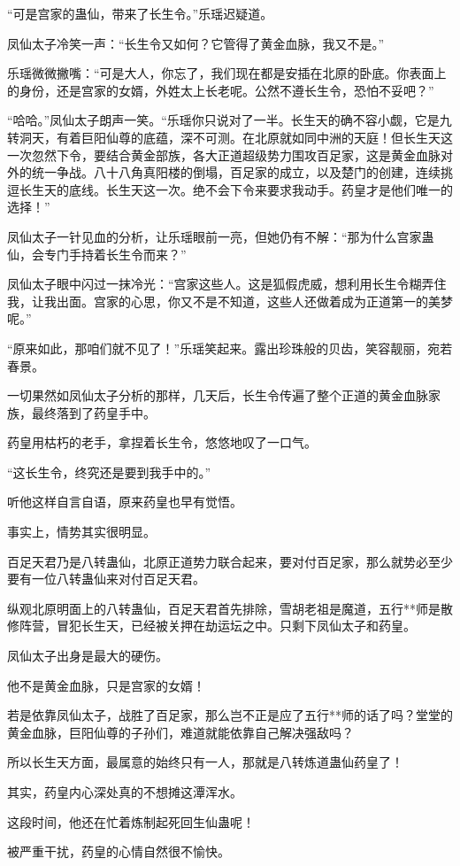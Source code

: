 \begin{this_body}
“可是宫家的蛊仙，带来了长生令。”乐瑶迟疑道。

凤仙太子冷笑一声：“长生令又如何？它管得了黄金血脉，我又不是。”

乐瑶微微撇嘴：“可是大人，你忘了，我们现在都是安插在北原的卧底。你表面上的身份，还是宫家的女婿，外姓太上长老呢。公然不遵长生令，恐怕不妥吧？”

“哈哈。”凤仙太子朗声一笑。“乐瑶你只说对了一半。长生天的确不容小觑，它是九转洞天，有着巨阳仙尊的底蕴，深不可测。在北原就如同中洲的天庭！但长生天这一次忽然下令，要结合黄金部族，各大正道超级势力围攻百足家，这是黄金血脉对外的统一争战。八十八角真阳楼的倒塌，百足家的成立，以及楚门的创建，连续挑逗长生天的底线。长生天这一次。绝不会下令来要求我动手。药皇才是他们唯一的选择！”

凤仙太子一针见血的分析，让乐瑶眼前一亮，但她仍有不解：“那为什么宫家蛊仙，会专门手持着长生令而来？”

凤仙太子眼中闪过一抹冷光：“宫家这些人。这是狐假虎威，想利用长生令糊弄住我，让我出面。宫家的心思，你又不是不知道，这些人还做着成为正道第一的美梦呢。”

“原来如此，那咱们就不见了！”乐瑶笑起来。露出珍珠般的贝齿，笑容靓丽，宛若春景。

一切果然如凤仙太子分析的那样，几天后，长生令传遍了整个正道的黄金血脉家族，最终落到了药皇手中。

药皇用枯朽的老手，拿捏着长生令，悠悠地叹了一口气。

“这长生令，终究还是要到我手中的。”

听他这样自言自语，原来药皇也早有觉悟。

事实上，情势其实很明显。

百足天君乃是八转蛊仙，北原正道势力联合起来，要对付百足家，那么就势必至少要有一位八转蛊仙来对付百足天君。

纵观北原明面上的八转蛊仙，百足天君首先排除，雪胡老祖是魔道，五行**师是散修阵营，冒犯长生天，已经被关押在劫运坛之中。只剩下凤仙太子和药皇。

凤仙太子出身是最大的硬伤。

他不是黄金血脉，只是宫家的女婿！

若是依靠凤仙太子，战胜了百足家，那么岂不正是应了五行**师的话了吗？堂堂的黄金血脉，巨阳仙尊的子孙们，难道就能依靠自己解决强敌吗？

所以长生天方面，最属意的始终只有一人，那就是八转炼道蛊仙药皇了！

其实，药皇内心深处真的不想摊这潭浑水。

这段时间，他还在忙着炼制起死回生仙蛊呢！

被严重干扰，药皇的心情自然很不愉快。


\end{this_body}
